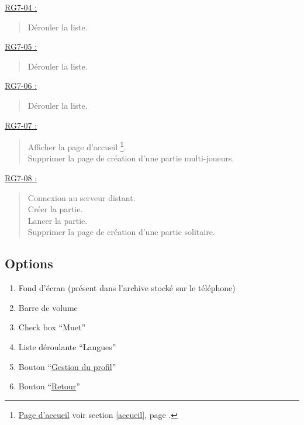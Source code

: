\documentclass{report}
\begin{document}
			\underline{RG7-04 :}
				\begin{quote}
					Dérouler la liste.\\
				\end{quote}


			\underline{RG7-05 :}
				\begin{quote}
					Dérouler la liste.\\				
				\end{quote}	
				

			\underline{RG7-06 :}
				\begin{quote}
					Dérouler la liste.\\				
				\end{quote}	


			\underline{RG7-07 :}
				\begin{quote}
					Afficher la page d'accueil%
						\footnote[1]{
							\hyperlink{Page d'accueil}{Page d'accueil}
							\og voir section \ref{accueil}, page \pageref{accueil}.\fg
						}.\\
					Supprimer la page de création d'une partie multi-joueurs.\\
				\end{quote}


			\underline{RG7-08 :}
				\begin{quote}
					 Connexion au serveur distant.\\
					 Créer la partie.\\
					 Lancer la partie.\\
					 Supprimer la page de création d'une partie solitaire.\\
				\end{quote}	
	 
\newpage

	\subsection{Options}
	
		\hypertarget{Options}{}
		\label{Options}
	
		\begin{center}
			
		\end{center}
				
		\begin{enumerate}
		  \item Fond d'écran (présent dans l'archive stocké sur le téléphone)
		  \item Barre de volume
		  \item Check box ``Muet''
		  \item Liste déroulante ``Langues''
		  \item Bouton ``\hyperlink{Page d'accueil}{Gestion du profil}''
		  \item Bouton ``\hyperlink{Page d'accueil}{Retour}''
		\end{enumerate}
\end{document}
